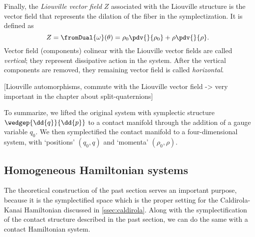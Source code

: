 Finally, the \emph{Liouville vector field} $Z$ associated with the Liouville structure is the vector field that represents the dilation of the fiber in the symplectization. It is defined as
\begin{equation}
    Z = \fromDual{\omega}(\theta) = \rho_0\pdv{}{\rho_0} + \rho\pdv{}{\rho}. 
    \label{eq:liouville_vf}
\end{equation}
Vector field (components) colinear with the Liouville vector fields are called \emph{vertical}; they represent dissipative action in the system. After the vertical components are removed, they remaining vector field is called \emph{horizontal}.

[Liouville automorphisms, commute with the Liouville vector field -> very important in the chapter about split-quaternions]

To summarize, we lifted the original system with symplectic structure $\wedgep{\dd{q}}{\dd{p}}$ to a contact manifold through the addition of a gauge variable $q_0$. We then symplectified the contact manifold to a four-dimensional system, with `positions' $(q_0, q)$ and `momenta' $(\rho_0, \rho)$.

\subsection{Homogeneous Hamiltonian systems} 
\label{ssec:homogeneous_systems}
The theoretical construction of the past section serves an important purpose, because it is the symplectified space which is the proper setting for the Caldirola-Kanai Hamiltonian discussed in \cref{ssec:caldirola}. Along with the symplectification of the contact structure described in the past section, we can do the same with a contact Hamiltonian system.

